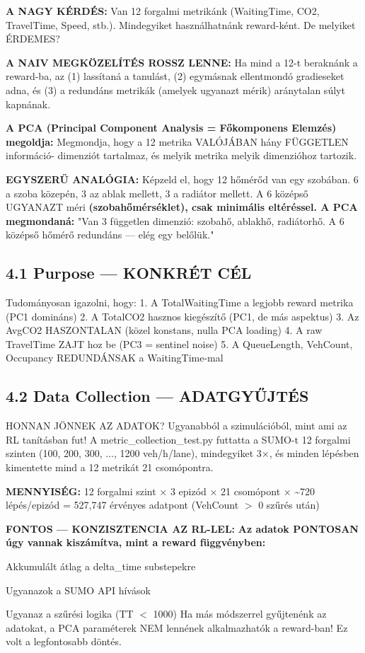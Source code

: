 \documentclass[11pt,a4paper]{article}
\begin{document}
\textbf{A NAGY KÉRDÉS:}
Van 12 forgalmi metrikánk (WaitingTime, CO2, TravelTime, Speed, stb.).
Mindegyiket használhatnánk reward-ként. De melyiket ÉRDEMES?

\textbf{A NAIV MEGKÖZELÍTÉS ROSSZ LENNE:}
Ha mind a 12-t beraknánk a reward-ba, az (1) lassítaná a tanulást,
(2) egymásnak ellentmondó gradieseket adna, és (3) a redundáns
metrikák (amelyek ugyanazt mérik) aránytalan súlyt kapnának.

\textbf{A PCA (Principal Component Analysis = Főkomponens Elemzés) megoldja:}
Megmondja, hogy a 12 metrika VALÓJÁBAN hány FÜGGETLEN információ-
dimenziót tartalmaz, és melyik metrika melyik dimenzióhoz tartozik.

\textbf{EGYSZERŰ ANALÓGIA:}
Képzeld el, hogy 12 hőmérőd van egy szobában. 6 a szoba közepén,
3 az ablak mellett, 3 a radiátor mellett. A 6 középső UGYANAZT méri
\textbf{(szobahőmérséklet), csak minimális eltéréssel. A PCA megmondaná:}
"Van 3 független dimenzió: szobahő, ablakhő, radiátorhő. A 6 középső
hőmérő redundáns — elég egy belőlük."

\subsection*{4.1 Purpose — KONKRÉT CÉL}
Tudományosan igazolni, hogy:
1. A TotalWaitingTime a legjobb reward metrika (PC1 domináns)
2. A TotalCO2 hasznos kiegészítő (PC1, de más aspektus)
3. Az AvgCO2 HASZONTALAN (közel konstans, nulla PCA loading)
4. A raw TravelTime ZAJT hoz be (PC3 = sentinel noise)
5. A QueueLength, VehCount, Occupancy REDUNDÁNSAK a WaitingTime-mal

\subsection*{4.2 Data Collection — ADATGYŰJTÉS}
HONNAN JÖNNEK AZ ADATOK?
Ugyanabból a szimulációból, mint ami az RL tanításban fut!
A metric\_collection\_test.py futtatta a SUMO-t 12 forgalmi szinten
(100, 200, 300, ..., 1200 veh/h/lane), mindegyiket 3×, és minden
lépésben kimentette mind a 12 metrikát 21 csomópontra.

\textbf{MENNYISÉG:}
12 forgalmi szint × 3 epizód × 21 csomópont × \textasciitilde{}720 lépés/epizód
= 527,747 érvényes adatpont (VehCount $>$ 0 szűrés után)

\textbf{FONTOS — KONZISZTENCIA AZ RL-LEL:}
\textbf{Az adatok PONTOSAN úgy vannak kiszámítva, mint a reward függvényben:}
\par\noindent\hspace*{1em}\textbullet{} Akkumulált átlag a delta\_time substepekre
\par\noindent\hspace*{1em}\textbullet{} Ugyanazok a SUMO API hívások
\par\noindent\hspace*{1em}\textbullet{} Ugyanaz a szűrési logika (TT $<$ 1000)
Ha más módszerrel gyűjtenénk az adatokat, a PCA paraméterek NEM
lennének alkalmazhatók a reward-ban! Ez volt a legfontosabb döntés.
\end{document}
